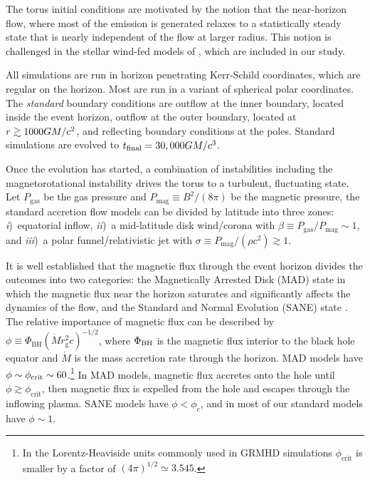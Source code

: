 The torus initial conditions are motivated by the notion that the near-horizon flow, where most of the emission is generated \citep{M87PaperV} relaxes to a statistically steady state that is nearly independent of the flow at larger radius.  This notion is challenged in the stellar wind-fed models of \cite{2020ApJ...896L...6R}, which are included in our study.

All simulations are run in horizon penetrating Kerr-Schild coordinates, which are regular on the horizon.
Most are run in a variant of spherical polar coordinates.
The \emph{standard} boundary conditions are outflow at the inner boundary, located inside the event horizon, outflow at the outer boundary, located at $r \gtrsim 1000 GM/c^2$, and reflecting boundary conditions at the poles.
Standard simulations are evolved to $t_\mathrm{final} = 30,000GM/c^3$.

Once the evolution has started, a combination of instabilities including the magnetorotational instability \citep[MRI][]{1992ApJ...400..610B} drives the torus to a turbulent, fluctuating state.
Let $P_\mathrm{gas}$ be the gas pressure and $P_\mathrm{mag} \equiv B^2 / (8\pi)$ be the magnetic pressure, the standard accretion flow models can be divided by latitude into three zones:
\emph{i})~equatorial inflow,
\emph{ii})~a mid-latitude disk wind/corona with  $\beta  \equiv P_\mathrm{gas} / P_\mathrm{mag} \sim 1$, and
\emph{iii})~a polar funnel/relativistic jet with $\sigma \equiv P_\mathrm{mag} / (\rho c^2) \gtrsim 1$.

It is well established \citep[see, e.g.,][and references therein]{M87PaperV, M87PaperVIII} that the magnetic flux through the event horizon divides the outcomes into two categories: the Magnetically Arrested Disk (MAD) state \citep[e.g.,][]{1974Ap&SS..28...45B, 2003ApJ...592.1042I, 2003PASJ...55L..69N} in which the magnetic flux near the horizon saturates and significantly affects the dynamics of the flow, and the Standard and Normal Evolution (SANE) state \citep[e.g.,][]{2003ApJ...589..444G, 2003ApJ...599.1238D, 2012MNRAS.426.3241N}.
The relative importance of magnetic flux can be described by $\phi \equiv \Phi_{\mathrm{BH}} (\dot{M} r_\mathrm{g}^2 c)^{-1/2}$, where $\Phi_{\rm BH}$ is the magnetic flux interior to the black hole equator and $\dot{M}$ is the mass accretion rate through the horizon.
MAD models have $\phi \sim \phi_{\rm crit} \sim 60$.\footnote{In the Lorentz-Heaviside units commonly used in GRMHD simulations $\phi_\mathrm{crit}$ is smaller by a factor of $(4\pi)^{1/2} \simeq 3.545$.}
In MAD models, magnetic flux accretes onto the hole until $\phi \gtrsim \phi_\mathrm{crit}$, then magnetic flux is expelled from the hole and escapes through the inflowing plasma.
SANE models have $\phi < \phi_c$, and in most of our standard models have $\phi \sim 1$.

